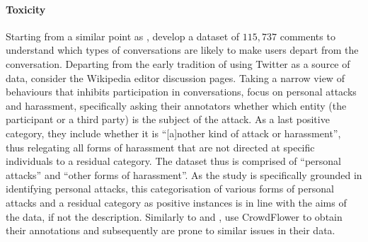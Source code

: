 \paragraph*{Toxicity} Starting from a similar point as \citet{Davidson:2017}, \citet{Wulczyn:2017} develop a dataset  of $115,737$ comments to understand which types of conversations are likely to make users depart from the conversation. 
Departing from the early tradition of using Twitter as a source of data, \citet{Wulczyn:2017} consider the Wikipedia editor discussion pages. 
Taking a narrow view of behaviours that inhibits participation in conversations, \citet{Wulczyn:2017} focus on personal attacks and harassment, specifically asking their annotators whether which entity (the participant or a third party) is the subject of the attack. 
As a last positive category, they include whether it is ``[a]nother kind of attack or harassment'', thus relegating all forms of harassment that are not directed at specific individuals to a residual category. 
The dataset thus is comprised of ``personal attacks'' and ``other forms of harassment''. 
As the study is specifically grounded in identifying personal attacks, this categorisation of various forms of personal attacks and a residual category as positive instances is in line with the aims of the data, if not the description.
Similarly to \citet{Waseem:2016} and \citet{Davidson:2017}, \citet{Wulczyn:2017} use CrowdFlower to obtain their annotations and subsequently are prone to similar issues in their data. 
